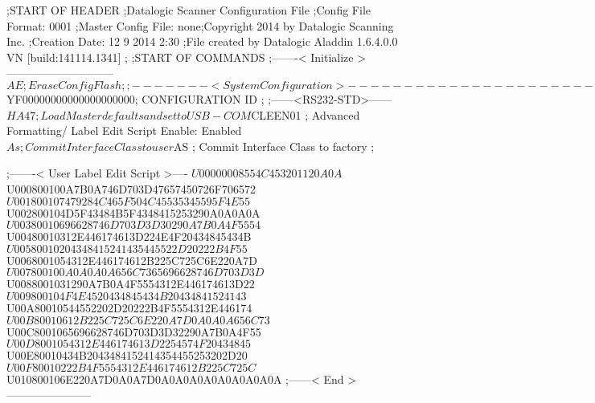 ;START OF HEADER
;Datalogic Scanner Configuration File
;Config File Format: 0001
;Master Config File: none;Copyright 2014 by Datalogic Scanning Inc.
;Creation Date: 12 9 2014 2:30
;File created by Datalogic Aladdin 1.6.4.0.0 VN [build:141114.1341]
;
;START OF COMMANDS
;-------< Initialize >-----------------------------
$AE                 ; Erase Config Flash
;
;-------< System Configuration >-------------------------------
$YF00000000000000000000; CONFIGURATION ID
;
;------<RS232-STD>------
$HA47               ; Load Master defaults and set to USB-COM
$CLEEN01            ; Advanced Formatting/ Label Edit Script Enable: Enabled
$As                 ; Commit Interface Class to user
$AS                 ; Commit Interface Class to factory
;

;-------< User Label Edit Script >----
$U00000008554C453201120A0A
$U000800100A7B0A746D703D47657450726F706572
$U001800107479284C465F504C45535345595F4E55
$U002800104D5F43484B5F4348415253290A0A0A0A
$U00380010696628746D703D3D30290A7B0A4F5554
$U00480010312E446174613D224E4F20434845434B
$U00580010204348415241435445522D20222B4F55
$U0068001054312E446174612B225C725C6E220A7D
$U007800100A0A0A0A656C7365696628746D703D3D
$U0088001031290A7B0A4F5554312E446174613D22
$U009800104F4E4520434845434B20434841524143
$U00A80010544552202D20222B4F5554312E446174
$U00B80010612B225C725C6E220A7D0A0A0A656C73
$U00C8001065696628746D703D3D32290A7B0A4F55
$U00D8001054312E446174613D2254574F20434845
$U00E80010434B2043484152414354455253202D20
$U00F80010222B4F5554312E446174612B225C725C
$U010800106E220A7D0A0A7D0A0A0A0A0A0A0A0A0A
;------< End >-----------------------
